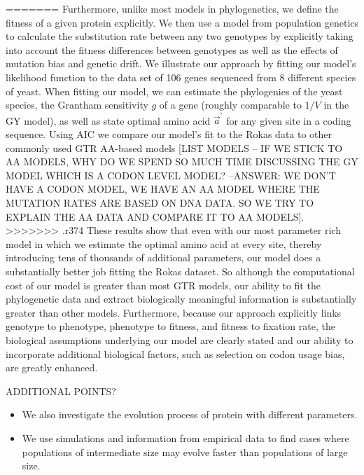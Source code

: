 \documentclass[13pt]{article}
\newcommand{\avecopt}{\ensuremath{\vec{a}^\prime}\xspace}
\begin{document}
=======
Furthermore, unlike most models in phylogenetics, we define the fitness of a given protein explicitly.
We then use a model from population genetics to calculate the substitution rate between any two genotypes by explicitly taking into account the fitness differences between genotypes as well as the effects of mutation bias and genetic drift.
We illustrate our approach by fitting our model's likelihood function to the \cite{RokasEtAl03} data set of 106 genes sequenced from 8 different species of yeast.
When fitting our model, we can estimate the phylogenies of the yeast species, the Grantham sensitivity $g$ of a gene (roughly comparable to $1/V$ in the GY model), as well as state optimal amino acid $\avecopt$ for any given site in a coding sequence.
Using AIC we compare our model's fit to the Rokas data to other commonly used GTR AA-based models [LIST MODELS -- IF WE STICK TO AA MODELS, WHY DO WE SPEND SO MUCH TIME DISCUSSING THE GY MODEL WHICH IS A CODON LEVEL MODEL? --ANSWER: WE DON'T HAVE A CODON MODEL, WE HAVE AN AA MODEL WHERE THE MUTATION RATES ARE BASED ON DNA DATA. SO WE TRY TO EXPLAIN THE AA DATA AND COMPARE IT TO AA MODELS].
>>>>>>> .r374
These results show that even with our most parameter rich model in which we estimate the optimal amino acid at every site, thereby introducing tens of thousands of additional parameters, our model does a substantially better job fitting the Rokas dataset.
So although the computational cost of our model is greater than most GTR models,  our ability to fit the phylogenetic data and extract biologically meaningful information is substantially greater than other models.
Furthermore, because our approach explicitly links genotype to phenotype, phenotype to fitness, and fitness to fixation rate, the biological assumptions underlying our model are clearly stated and our ability to incorporate additional biological factors, such as selection on codon usage bias, are greatly enhanced.
 
ADDITIONAL POINTS?
\begin{itemize}
\item We also investigate the evolution process of protein with different parameters.
\item We use simulations and information from empirical data to find cases where populations of intermediate size may evolve faster than populations of large size.
\end{itemize}


\end{document}
